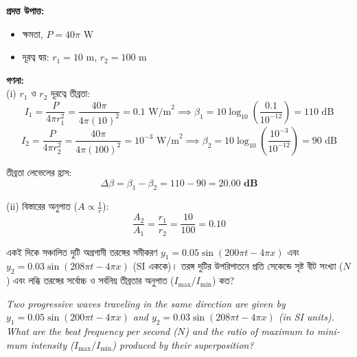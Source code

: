 \documentclass[12pt, a4paper]{article}
\begin{document}
\begin{tcolorbox}[solutionbox={সমাধান (Solution)}]
    \noindent
    \textbf{প্রদত্ত উপাত্ত:}
    \begin{itemize}[leftmargin=1.5em, itemsep=0.2em]
        \item ক্ষমতা, $P = 40\pi\text{ W}$
        \item দূরত্ব দ্বয়: $r_1 = 10\text{ m}$, $r_2 = 100\text{ m}$
    \end{itemize}

    \vspace{0.6em}
    \noindent\textbf{গণনা:} \\
    (i) $r_1$ ও $r_2$ দূরত্বে তীব্রতা:
    \[ I_1 = \frac{P}{4\pi r_1^2} = \frac{40\pi}{4\pi(10)^2} = 0.1\text{ W/m}^2 \implies \beta_1 = 10 \log_{10}\left(\frac{0.1}{10^{-12}}\right) = 110\text{ dB} \]
    \[ I_2 = \frac{P}{4\pi r_2^2} = \frac{40\pi}{4\pi(100)^2} = 10^{-3}\text{ W/m}^2 \implies \beta_2 = 10 \log_{10}\left(\frac{10^{-3}}{10^{-12}}\right) = 90\text{ dB} \]
    
    তীব্রতা লেভেলের হ্রাস:
    \[ \Delta \beta = \beta_1 - \beta_2 = 110 - 90 = \mathbf{20.00\text{ dB}} \]
    
    (ii) বিস্তারের অনুপাত ($A \propto \frac{1}{r}$):
    \[ \frac{A_2}{A_1} = \frac{r_1}{r_2} = \frac{10}{100} = \mathbf{0.10} \]
\end{tcolorbox}


\begin{tcolorbox}[questionbox={প্রশ্ন (Question) 15}]
    \noindent
    একই দিকে সঞ্চালিত দুটি অগ্রগামী তরঙ্গের সমীকরণ $y_1 = 0.05 \sin(200\pi t - 4\pi x)$ এবং $y_2 = 0.03 \sin(208\pi t - 4\pi x)$ (SI এককে)। তরঙ্গ দুটির উপরিপাতনে প্রতি সেকেন্ডে সৃষ্ট বীট সংখ্যা ($N$) এবং লব্ধি তরঙ্গের সর্বোচ্চ ও সর্বনিম্ন তীব্রতার অনুপাত ($I_{\text{max}} / I_{\text{min}}$) কত?
    
    \vspace{0.8em}
    \begin{english}
    \noindent\textit{\color{darkgray}
    Two progressive waves traveling in the same direction are given by $y_1 = 0.05 \sin(200\pi t - 4\pi x)$ and $y_2 = 0.03 \sin(208\pi t - 4\pi x)$ (in SI units). What are the beat frequency per second ($N$) and the ratio of maximum to minimum intensity ($I_{\text{max}} / I_{\text{min}}$) produced by their superposition?
    }
    \end{english}
\end{tcolorbox}
\end{document}
